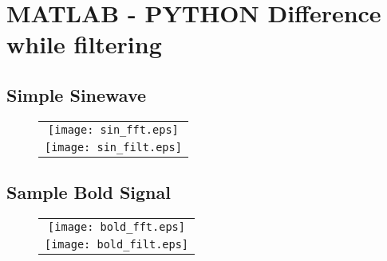 \documentclass[12pt]{article}
\begin{document}
\newpage

\section{MATLAB - PYTHON Difference while filtering}

\subsection{Simple Sinewave}

\begin{figure}[htp!]
  \centering
    \begin{tabular}{c}
  \texttt{[image: sin\_fft.eps]} \\   
  \texttt{[image: sin\_filt.eps]}\\ 


	\end{tabular}	
	\label{figur}\caption{}
	
\end{figure}

\newpage


\subsection{Sample Bold Signal}

\begin{figure}[htp!]
  \centering
    \begin{tabular}{c}
  \texttt{[image: bold\_fft.eps]} \\   
  \texttt{[image: bold\_filt.eps]}\\ 


	\end{tabular}	
	\label{figur}\caption{}
	
\end{figure}
\end{document}
